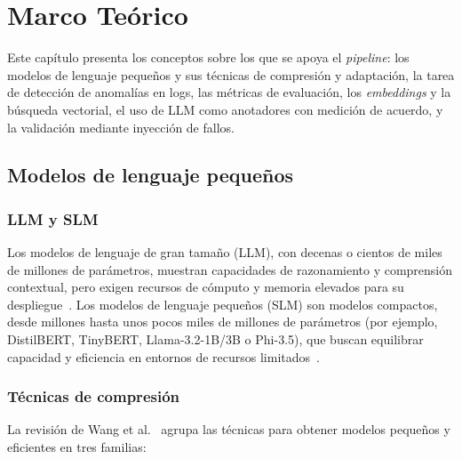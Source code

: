 \chapter{Marco Teórico} \label{cap:marco_teorico}

Este capítulo presenta los conceptos sobre los que se apoya el \textit{pipeline}: los modelos de lenguaje pequeños y sus técnicas de compresión y adaptación, la tarea de detección de anomalías en logs, las métricas de evaluación, los \textit{embeddings} y la búsqueda vectorial, el uso de LLM como anotadores con medición de acuerdo, y la validación mediante inyección de fallos.

\section{Modelos de lenguaje pequeños}\label{sec:mt_slm}

\subsection{LLM y SLM}

Los modelos de lenguaje de gran tamaño (LLM), con decenas o cientos de miles de millones de parámetros, muestran capacidades de razonamiento y comprensión contextual, pero exigen recursos de cómputo y memoria elevados para su despliegue~\cite{wang2025_slm_survey, chen2025_collab_survey}. Los modelos de lenguaje pequeños (SLM) son modelos compactos, desde millones hasta unos pocos miles de millones de parámetros (por ejemplo, DistilBERT, TinyBERT, Llama-3.2-1B/3B o Phi-3.5), que buscan equilibrar capacidad y eficiencia en entornos de recursos limitados~\cite{wang2025_slm_survey, saha2025_slm_minimal}.

\subsection{Técnicas de compresión}\label{subsec:mt_compresion}

La revisión de Wang et al.~\cite{wang2025_slm_survey} agrupa las técnicas para obtener modelos pequeños y eficientes en tres familias:

